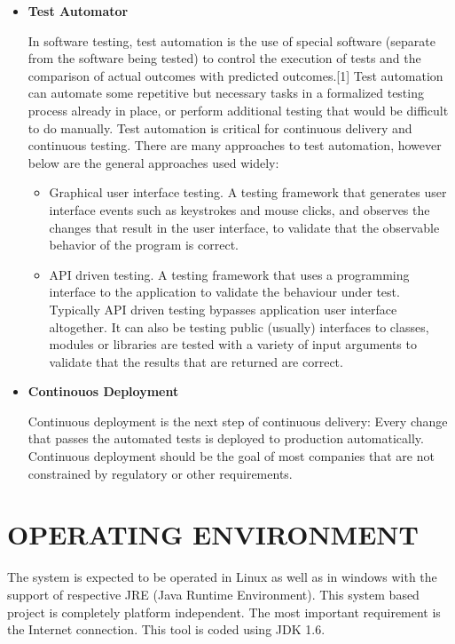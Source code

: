 \documentclass[12pt,a4paper,oneside]{report}
\begin{document}
{\begin{itemize}
Jenkins is an automation engine with an unparalleled plugin ecosystem to support all of your favorite tools in your delivery pipelines, whether your goal is continuous integration, automated testing, or continuous delivery. 
 \item  \textbf{Test Automator}
\par In software testing, test automation is the use of special software (separate from the software being tested) to control the execution of tests and the comparison of actual outcomes with predicted outcomes.[1] Test automation can automate some repetitive but necessary tasks in a formalized testing process already in place, or perform additional testing that would be difficult to do manually. Test automation is critical for continuous delivery and continuous testing. There are many approaches to test automation, however below are the general approaches used widely:

\begin{itemize}
\item Graphical user interface testing. A testing framework that generates user interface events such as keystrokes and mouse clicks, and observes the changes that result in the user interface, to validate that the observable behavior of the program is correct.
\item API driven testing. A testing framework that uses a programming interface to the application to validate the behaviour under test. Typically API driven testing bypasses application user interface altogether. It can also be testing public (usually) interfaces to classes, modules or libraries are tested with a variety of input arguments to validate that the results that are returned are correct.
\end{itemize}


\item \textbf{Continouos Deployment}
\par Continuous deployment is the next step of continuous delivery: Every change that passes the automated tests is deployed to production automatically. Continuous deployment should be the goal of most companies that are not constrained by regulatory or other requirements.

\end{itemize}

 
\section{OPERATING ENVIRONMENT}
The system is expected to be operated in Linux as well as in windows with the support of
respective JRE (Java Runtime Environment). This system based project is completely platform
independent. The most important requirement is the Internet connection. This tool is coded
using JDK 1.6.
}
\end{document}
